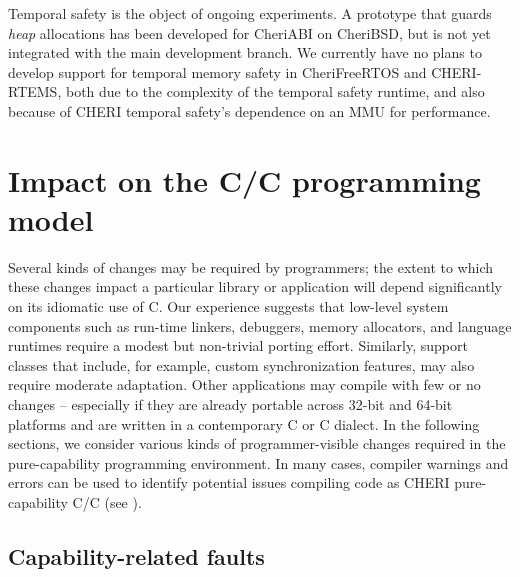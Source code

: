 \documentclass[12pt,twoside,openright,usletter]{article}
\newcommand{\note}[2]{{\color{blue}[ Note: #1 - #2]}}
\renewcommand{\note}[2]{\relax\ifhmode\unskip\fi}
\newcommand{\rwnote}[1]{\note{#1}{Robert W.}}
\newcommand*{\cpp}[1][]{C\textsmaller[2]{\nolinebreak[4]\hspace{-.05em}\raisebox{.45ex}{\textbf{++}}}}
\newcommand*{\cppInHeader}[1][]{\texorpdfstring{\cpp{}}{C++}}
\newcommand*{\purecapCOrCpp}[1]{CHERI pure-capability C/\cpp{}}
\begin{document}

\noindent
Temporal safety is the object of ongoing experiments.
A prototype that guards \emph{heap} allocations has been developed for
CheriABI on CheriBSD, but is not yet integrated with the main development
branch.
We currently have no plans to develop support for temporal memory safety in
CheriFreeRTOS and CHERI-RTEMS, both due to the complexity of the temporal
safety runtime, and also because of CHERI temporal safety's dependence on an
MMU for performance.

%

\section{Impact on the C/\cppInHeader{} programming model}
Several kinds of changes may be required by programmers; the extent to which
these changes impact a particular library or application will depend
significantly on its idiomatic use of C.
Our experience suggests that low-level system components such as run-time
linkers, debuggers, memory allocators, and language runtimes require a modest
but non-trivial porting effort.
Similarly, support classes that include, for example, custom synchronization
features, may also require moderate adaptation.
Other applications may compile with few or no changes -- especially if they
are already portable across 32-bit and 64-bit platforms and are written in a contemporary C or \cpp{} dialect.
In the following sections, we consider various kinds of programmer-visible
changes required in the pure-capability programming environment.
In many cases, compiler warnings and errors can be used to identify potential
issues compiling code as \purecapCOrCpp{} (see
).
\rwnote{Alex: Can we use the word ``most'' instead of ``many''?}

\subsection{Capability-related faults}
\label{sec:faults}
\end{document}
